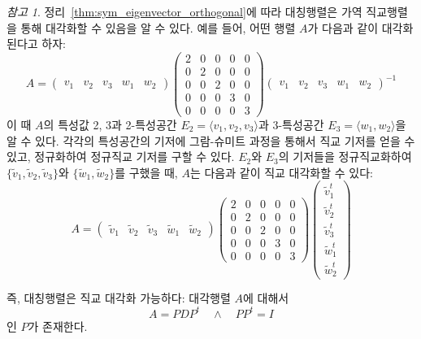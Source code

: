 \documentclass[unfonts,oneside,a4paper]{oblivoir}
\theoremstyle{definition}
\theoremstyle{theorem}
\theoremstyle{theorem}
\theoremstyle{remark}
\newtheorem*{remark}{참고}
\theoremstyle{remark}
\theoremstyle{remark}
\theoremstyle{remark}
\renewcommand{\vec}[1]{\bm{\mathit{#1}}}
\begin{document}
\begin{remark}
    정리~\ref{thm:sym_eigenvector_orthogonal}에 따라 대칭행렬은 가역 직교행렬을 통해 대각화할 수 있음을 알 수 있다.
    예를 들어, 어떤 행렬 $A$가 다음과 같이 대각화된다고 하자:
    \begin{equation*}
        A =
        \begin{pmatrix}
            \vec v_1 & \vec v_2 & \vec v_3 & \vec w_1 & \vec w_2
        \end{pmatrix}
        \begin{pmatrix}
            2 & 0 & 0 & 0 & 0\\
            0 & 2 & 0 & 0 & 0\\
            0 & 0 & 2 & 0 & 0\\
            0 & 0 & 0 & 3 & 0\\
            0 & 0 & 0 & 0 & 3
        \end{pmatrix}
        \begin{pmatrix}
            \vec v_1 & \vec v_2 & \vec v_3 & \vec w_1 & \vec w_2
        \end{pmatrix}^{-1}
    \end{equation*}
    이 때 $A$의 특성값 2, 3과 2-특성공간 $E_2 = \langle \vec v_1, \vec v_2, \vec v_3 \rangle$과 3-특성공간 $E_3 = \langle \vec w_1, \vec w_2\rangle$을 알 수 있다.
    각각의 특성공간의 기저에 그람-슈미트 과정을 통해서 직교 기저를 얻을 수 있고, 정규화하여 정규직교 기저를 구할 수 있다.
    $E_2$와 $E_3$의 기저들을 정규직교화하여 $\{\tilde{\vec v}_1, \tilde{\vec v}_2, \tilde{\vec v}_3\}$와 $\{\tilde{\vec w}_1, \tilde{\vec w}_2\}$를 구했을 때, $A$는 다음과 같이 직교 대각화할 수 있다:
    \begin{equation*}
        A =
        \begin{pmatrix}
            \tilde{\vec{v}}_1 & \tilde{\vec{v}}_2 & \tilde{\vec{v}}_3 & \tilde{\vec{w}}_1 & \tilde{\vec{w}}_2
        \end{pmatrix}
        \begin{pmatrix}
            2 & 0 & 0 & 0 & 0\\
            0 & 2 & 0 & 0 & 0\\
            0 & 0 & 2 & 0 & 0\\
            0 & 0 & 0 & 3 & 0\\
            0 & 0 & 0 & 0 & 3
        \end{pmatrix}
        \begin{pmatrix}
            \tilde{\vec{v}}_1^t \\ \tilde{\vec{v}}_2^t \\ \tilde{\vec{v}}_3^t \\ \tilde{\vec{w}}_1^t \\ \tilde{\vec{w}}_2^t
        \end{pmatrix}
    \end{equation*}
    
    즉, 대칭행렬은 직교 대각화 가능하다:
    대각행렬 $A$에 대해서
    \begin{equation*}
        A = PDP^t \quad \wedge \quad PP^t = I
    \end{equation*}
    인 $P$가 존재한다.
\end{remark}
\end{document}
